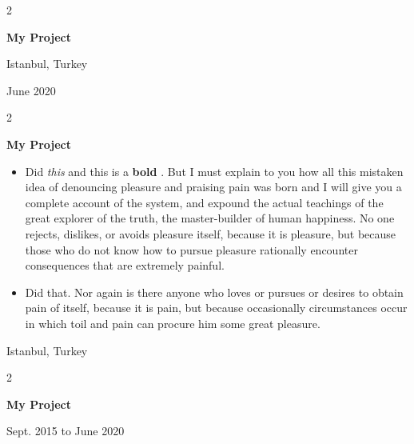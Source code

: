 \documentclass[10pt, letterpaper]{article}
\newenvironment{highlights}{
    \begin{itemize}[
        topsep=0.10 cm,
        parsep=0.10 cm,
        partopsep=0pt,
        itemsep=0pt,
        leftmargin=0.4 cm + 10pt
    ]
}{
    \end{itemize}
} %
\newenvironment{twocolentry}[2][]{
    \onecolentry
    \def\secondColumn{#2}
    \setcolumnwidth{\fill, 4.5 cm}
    \begin{paracol}{2}
}{
    \switchcolumn \raggedleft \secondColumn
    \end{paracol}
    \endonecolentry
} %
\let\hrefWithoutArrow\href
\renewcommand{\href}[2]{\hrefWithoutArrow{#1}{\mbox{\ifthenelse{\equal{#2}{}}{ }{#2 }\raisebox{.15ex}{\footnotesize \faExternalLink*}}}}
\begin{document}
        \vspace{0.2 cm}

        \begin{twocolentry}{
            Istanbul, Turkey

        June 2020
        }
            \textbf{My Project}
        \end{twocolentry}


        \vspace{0.2 cm}

        \begin{twocolentry}{
            Istanbul, Turkey
        }
            \textbf{My Project}
            \begin{highlights}
                \item Did \textit{this} and this is a \textbf{bold} \href{https://example.com}{link}. But I must explain to you how all this mistaken idea of denouncing pleasure and praising pain was born and I will give you a complete account of the system, and expound the actual teachings of the great explorer of the truth, the master-builder of human happiness. No one rejects, dislikes, or avoids pleasure itself, because it is pleasure, but because those who do not know how to pursue pleasure rationally encounter consequences that are extremely painful.
                \item Did that. Nor again is there anyone who loves or pursues or desires to obtain pain of itself, because it is pain, but because occasionally circumstances occur in which toil and pain can procure him some great pleasure.
            \end{highlights}
        \end{twocolentry}


        \vspace{0.2 cm}

        \begin{twocolentry}{
            Sept. 2015 to June 2020
        }
            \textbf{My Project}
        \end{twocolentry}


        \vspace{0.2 cm}
\end{document}
